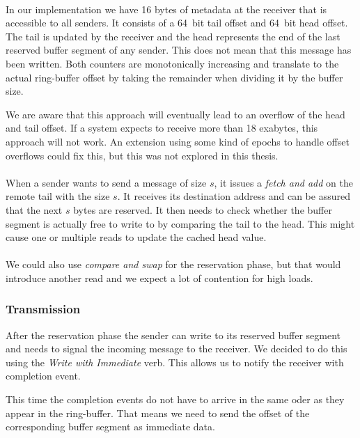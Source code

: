 \paragraph{} In our implementation we have 16 bytes of metadata at the receiver that is accessible to all senders. It consists
of a 64~bit tail offset and 64~bit head offset. The tail is updated by the receiver and the head represents the end of the
last reserved buffer segment of any sender. This does not mean that this message has been written. Both counters are
monotonically increasing and translate to the actual ring-buffer offset by taking the remainder when dividing it by
the buffer size.

We are aware that this approach will eventually lead to an overflow of the head and tail offset. If a system expects to receive
more than 18 exabytes, this approach will not work. An extension using some kind of epochs to handle offset overflows could
fix this, but this was not explored in this thesis.

\paragraph{}When a sender wants to send a message of size $s$, it issues a \emph{fetch and add} on the remote tail with the 
size $s$. It receives its destination address and can be assured that the next $s$ bytes are reserved. It then needs
to check whether the buffer segment is actually free to write to by comparing the tail to the head. This might cause one 
or multiple reads to update the cached head value.

\paragraph{} We could also use \emph{compare and swap} for the reservation phase, but that would introduce another read and
we expect a lot of contention for high loads.

\subsubsection{Transmission}
After the reservation phase the sender can write to its reserved buffer segment and needs to signal the incoming message
to the receiver. We decided to do this using the \emph{Write with Immediate} verb. This allows us to notify the receiver 
with completion event. 

This time the completion events do not have to arrive in the same oder as they appear in
the ring-buffer. That means we need to send the offset of the corresponding buffer segment as immediate data.


